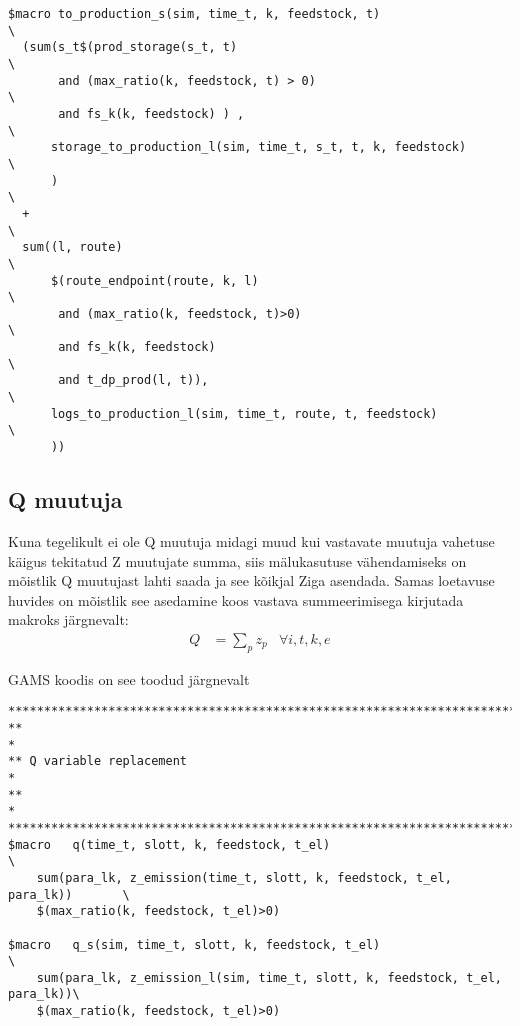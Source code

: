 \begin{verbatim}
$macro to_production_s(sim, time_t, k, feedstock, t)                           \
  (sum(s_t$(prod_storage(s_t, t)                                               \
       and (max_ratio(k, feedstock, t) > 0)                                    \
       and fs_k(k, feedstock) ) ,                                              \
      storage_to_production_l(sim, time_t, s_t, t, k, feedstock)               \
      )                                                                        \
  +                                                                            \
  sum((l, route)                                                               \
      $(route_endpoint(route, k, l)                                            \
       and (max_ratio(k, feedstock, t)>0)                                      \
       and fs_k(k, feedstock)                                                  \
       and t_dp_prod(l, t)),                                                   \
      logs_to_production_l(sim, time_t, route, t, feedstock)                   \
      )) 
\end{verbatim}

\subsection{Q muutuja}             
Kuna tegelikult ei ole Q muutuja midagi muud kui vastavate muutuja vahetuse käigus tekitatud Z muutujate summa, siis mälukasutuse vähendamiseks on mõistlik Q muutujast lahti saada ja see kõikjal Ziga asendada. Samas loetavuse huvides on mõistlik see asedamine koos vastava summeerimisega kirjutada makroks järgnevalt:
\begin{align}
Q &= \sum_p z_p & \forall i,t,k,e 
\end{align}

GAMS koodis on see toodud järgnevalt
\begin{verbatim}
********************************************************************************
**                                                                             *
** Q variable replacement                                                      *
**                                                                             *
********************************************************************************
$macro   q(time_t, slott, k, feedstock, t_el)                                  \
    sum(para_lk, z_emission(time_t, slott, k, feedstock, t_el, para_lk))       \
    $(max_ratio(k, feedstock, t_el)>0)

$macro   q_s(sim, time_t, slott, k, feedstock, t_el)                           \
    sum(para_lk, z_emission_l(sim, time_t, slott, k, feedstock, t_el, para_lk))\
    $(max_ratio(k, feedstock, t_el)>0)
\end{verbatim}



